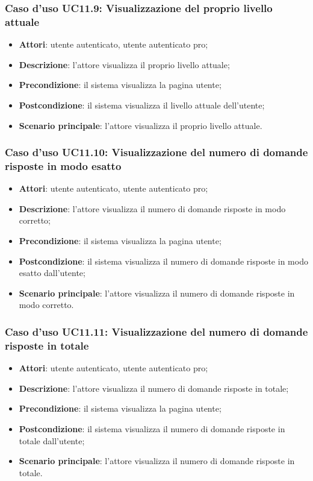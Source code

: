 \subsubsection{Caso d'uso UC11.9: Visualizzazione del proprio livello attuale }
\begin{itemize}
	\item\textbf{Attori}: utente autenticato, utente autenticato pro;
	\item\textbf{Descrizione}: l'attore visualizza il proprio livello attuale;
	\item\textbf{Precondizione}: il sistema visualizza la pagina utente;
	\item\textbf{Postcondizione}: il sistema visualizza il livello attuale dell'utente;
	\item\textbf{Scenario principale}: l'attore visualizza il proprio livello attuale.
\end{itemize}

\subsubsection{Caso d'uso UC11.10: Visualizzazione del numero di domande risposte in modo esatto}
\begin{itemize}
	\item\textbf{Attori}: utente autenticato, utente autenticato pro;
	\item\textbf{Descrizione}: l'attore visualizza il numero di domande risposte in modo corretto;
	\item\textbf{Precondizione}: il sistema visualizza la pagina utente;
	\item\textbf{Postcondizione}: il sistema visualizza il numero di domande risposte in modo esatto dall'utente;
	\item\textbf{Scenario principale}: l'attore visualizza il numero di domande risposte in modo corretto.
\end{itemize}

\subsubsection{Caso d'uso UC11.11: Visualizzazione del numero di domande risposte in totale}
\begin{itemize}
	\item\textbf{Attori}: utente autenticato, utente autenticato pro;
	\item\textbf{Descrizione}: l'attore visualizza il numero di domande risposte in totale;
	\item\textbf{Precondizione}: il sistema visualizza la pagina utente;
	\item\textbf{Postcondizione}: il sistema visualizza il numero di domande risposte in totale dall'utente;
	\item\textbf{Scenario principale}: l'attore visualizza il numero di domande risposte in totale.
\end{itemize}